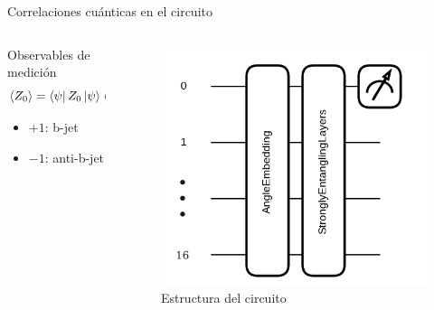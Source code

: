 \documentclass[aspectratio=43]{beamer}
\begin{document}
\begin{frame}{Correlaciones cuánticas en el circuito}
  \begin{columns}
    \begin{column}{0.6\textwidth}
      \vspace{-0.2em}
      \begin{alertblock}{Observables de medición}
        \[ \langle Z_0 \rangle = \bra{\psi} Z_0 \ket{\psi} \in [-1,1] \]
        \begin{itemize}
          \item $+1$: b-jet
          \item $-1$: anti-b-jet
        \end{itemize}
      \end{alertblock}
    \end{column}
    \begin{column}{0.38\textwidth}
      \begin{figure}
        \includegraphics[width=\textwidth]{circuito.png}
        \caption{Estructura del circuito}
      \end{figure}
    \end{column}
  \end{columns}
\end{frame}

\end{document}

